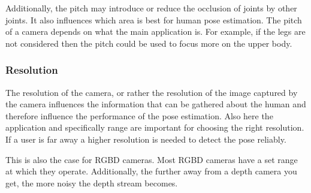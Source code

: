 Additionally, the pitch may introduce or reduce the occlusion of joints by other joints. It also influences which area is best for human pose estimation. The pitch of a camera depends on what the main application is. For example, if the legs are not considered then the pitch could be used to focus more on the upper body.

\subsubsection{Resolution}

The resolution of the camera, or rather the resolution of the image captured by the camera influences the information that can be gathered about the human and therefore influence the performance of the pose estimation. Also here the application and specifically range are important for choosing the right resolution. If a user is far away a higher resolution is needed to detect the pose reliably.

This is also the case for RGBD cameras. Most RGBD cameras have a set range at which they operate. Additionally, the further away from a depth camera you get, the more noisy the depth stream becomes.